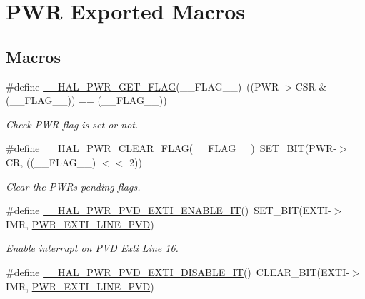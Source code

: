 \hypertarget{group___p_w_r___exported___macros}{}\section{P\+WR Exported Macros}
\label{group___p_w_r___exported___macros}
\subsection*{Macros}
\begin{DoxyCompactItemize}
\item 
\#define \hyperlink{group___p_w_r___exported___macros_ga2977135bbea35b786805eea640d1c884}{\+\_\+\+\_\+\+H\+A\+L\+\_\+\+P\+W\+R\+\_\+\+G\+E\+T\+\_\+\+F\+L\+AG}(\+\_\+\+\_\+\+F\+L\+A\+G\+\_\+\+\_\+)~((P\+WR-\/$>$C\+SR \& (\+\_\+\+\_\+\+F\+L\+A\+G\+\_\+\+\_\+)) == (\+\_\+\+\_\+\+F\+L\+A\+G\+\_\+\+\_\+))
\begin{DoxyCompactList}\small\item\em Check P\+WR flag is set or not. \end{DoxyCompactList}\item 
\#define \hyperlink{group___p_w_r___exported___macros_ga96f24bf4b16c9f944cd829100bf746e5}{\+\_\+\+\_\+\+H\+A\+L\+\_\+\+P\+W\+R\+\_\+\+C\+L\+E\+A\+R\+\_\+\+F\+L\+AG}(\+\_\+\+\_\+\+F\+L\+A\+G\+\_\+\+\_\+)~S\+E\+T\+\_\+\+B\+IT(P\+WR-\/$>$CR, ((\+\_\+\+\_\+\+F\+L\+A\+G\+\_\+\+\_\+) $<$$<$ 2))
\begin{DoxyCompactList}\small\item\em Clear the P\+WR\textquotesingle{}s pending flags. \end{DoxyCompactList}\item 
\#define \hyperlink{group___p_w_r___exported___macros_ga3180f039cf14ef78a64089f387f8f9c2}{\+\_\+\+\_\+\+H\+A\+L\+\_\+\+P\+W\+R\+\_\+\+P\+V\+D\+\_\+\+E\+X\+T\+I\+\_\+\+E\+N\+A\+B\+L\+E\+\_\+\+IT}()~S\+E\+T\+\_\+\+B\+IT(E\+X\+TI-\/$>$I\+MR, \hyperlink{group___p_w_r___private___constants_ga43a49255649e03d2d2b6b12c5c379d2b}{P\+W\+R\+\_\+\+E\+X\+T\+I\+\_\+\+L\+I\+N\+E\+\_\+\+P\+VD})
\begin{DoxyCompactList}\small\item\em Enable interrupt on P\+VD Exti Line 16. \end{DoxyCompactList}\item 
\#define \hyperlink{group___p_w_r___exported___macros_gad240d7bf8f15191b068497b9aead1f1f}{\+\_\+\+\_\+\+H\+A\+L\+\_\+\+P\+W\+R\+\_\+\+P\+V\+D\+\_\+\+E\+X\+T\+I\+\_\+\+D\+I\+S\+A\+B\+L\+E\+\_\+\+IT}()~C\+L\+E\+A\+R\+\_\+\+B\+IT(E\+X\+TI-\/$>$I\+MR, \hyperlink{group___p_w_r___private___constants_ga43a49255649e03d2d2b6b12c5c379d2b}{P\+W\+R\+\_\+\+E\+X\+T\+I\+\_\+\+L\+I\+N\+E\+\_\+\+P\+VD})
$$
\end{DoxyCompactItemize}
